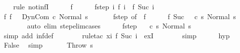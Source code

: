 \begin{isabellebody}
\ \ \isamarkupfalse%
\ {\isacharparenleft}rule\ not{\isacharunderscore}infI{\isacharparenright}\isanewline
\ \ \ \ \isamarkupfalse%
\ f\isanewline
\ \ \ \ \isamarkupfalse%
\ f{\isacharunderscore}step{\isacharcolon}\ {\isachardoublequoteopen}{\isasymAnd}i{\isachardot}\ {\isasymGamma}{\isasymturnstile}f\ i\ {\isasymrightarrow}\ f\ {\isacharparenleft}Suc\ i{\isacharparenright}{\isachardoublequoteclose}\isanewline
\ \ \ \ \isamarkupfalse%
\ f{\isacharunderscore}{}{\isacharcolon}\ {\isachardoublequoteopen}f\ {}\ {\isacharequal}\ {\isacharparenleft}DynCom\ c{\isacharcomma}\ Normal\ s{\isacharparenright}{\isachardoublequoteclose}\ \isanewline
\ \ \ \ \isamarkupfalse%
\ f{\isacharunderscore}step\ {\isacharbrackleft}of\ {}{\isacharbrackright}\ f{\isacharunderscore}{}\isanewline
\ \ \ \ \isamarkupfalse%
\ {\isachardoublequoteopen}f\ {\isacharparenleft}Suc\ {}{\isacharparenright}\ {\isacharequal}\ {\isacharparenleft}c\ s{\isacharcomma}\ Normal\ s{\isacharparenright}{\isachardoublequoteclose}\isanewline
\ \ \ \ \ \ \isamarkupfalse%
\ {\isacharparenleft}auto\ elim{\isacharcolon}\ step{\isacharunderscore}elim{\isacharunderscore}cases{\isacharparenright}\isanewline
\ \ \ \ \isamarkupfalse%
\ f{\isacharunderscore}step\ \isamarkupfalse%
\ {\isachardoublequoteopen}{\isasymGamma}{\isasymturnstile}\ {\isacharparenleft}c\ s{\isacharcomma}\ Normal\ s{\isacharparenright}\ {\isasymrightarrow}\ {\isasymdots}{\isacharparenleft}{\isasyminfinity}{\isacharparenright}{\isachardoublequoteclose}\isanewline
\ \ \ \ \ \ \isamarkupfalse%
\ {\isacharparenleft}simp\ add{\isacharcolon}\ inf{\isacharunderscore}def{\isacharparenright}\isanewline
\ \ \ \ \ \ \isamarkupfalse%
\ {\isacharparenleft}rule{\isacharunderscore}tac\ x{\isacharequal}{\isachardoublequoteopen}{\isasymlambda}i{\isachardot}\ f\ {\isacharparenleft}Suc\ i{\isacharparenright}{\isachardoublequoteclose}\ \ exI{\isacharparenright}\isanewline
\ \ \ \ \ \ \isamarkupfalse%
\ simp\isanewline
\ \ \ \ \isamarkupfalse%
\ hyp\isanewline
\ \ \ \ \isamarkupfalse%
\ False\ \isamarkupfalse%
\ simp\isanewline
\ \ \isamarkupfalse%
\isanewline
{}\isamarkupfalse%
\isanewline
\ \ \isamarkupfalse%
\ {\isacharparenleft}Throw\ s{\isacharparenright}\ \isamarkupfalse%

\end{isabellebody}
